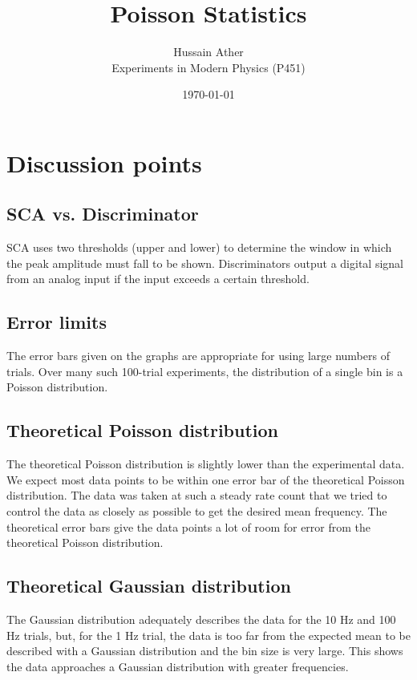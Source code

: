 \documentclass[10pt]{article}
\begin{document}
\title{Poisson Statistics}
\author{Hussain Ather \\ Experiments in Modern Physics (P451)}
\date{\today}

\maketitle

\section{Discussion points}

\subsection{SCA vs. Discriminator}

SCA uses two thresholds (upper and lower) to determine the window in which the peak amplitude must fall to be shown. Discriminators output a digital signal from an analog input if the input exceeds a certain threshold.

\subsection{Error limits}

The error bars given on the graphs are appropriate for using large numbers of trials. Over many such 100-trial experiments, the distribution of a single bin is a Poisson distribution.

\subsection{Theoretical Poisson distribution}

The theoretical Poisson distribution is slightly lower than the experimental data. We expect most data points to be within one error bar of the theoretical Poisson distribution. The data was taken at such a steady rate count that we tried to control the data as closely as possible to get the desired mean frequency. The theoretical error bars give the data points a lot of room for error from the theoretical Poisson distribution.

\subsection{Theoretical Gaussian distribution}

 The Gaussian distribution adequately describes the data for the 10 Hz and 100 Hz trials, but, for the 1 Hz trial, the data is too far from the expected mean to be described with a Gaussian distribution and the bin size is very large. This shows the data approaches a Gaussian distribution with greater frequencies. 
\end{document}
